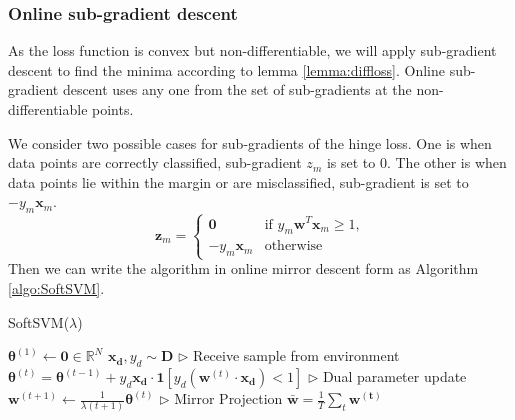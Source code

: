 \documentclass[11pt]{article}
\begin{document}
\subsubsection{Online sub-gradient descent} 


\normalfont
As the loss function is convex but non-differentiable, we will apply sub-gradient descent to find the minima according to lemma \ref{lemma:diffloss}. Online sub-gradient descent uses any one from the set of sub-gradients at the non-differentiable points.

\normalfont
We consider two possible cases for sub-gradients of the hinge loss. One is when data points are correctly classified, sub-gradient $z_m$ is set to 0. The other is when data points lie within the margin or are misclassified, sub-gradient is set to $-y_m\mathbf{x}_m$. 
\[ \mathbf{z}_m =
    \begin{cases}
         \mathbf{0} & 
         \text{if  $y_m\mathbf{w}^T\mathbf{x}_m \geq 1$,}\\
        -y_m\mathbf{x}_m & \text{otherwise}
    \end{cases}
\]
Then we can write the algorithm in online mirror descent form as Algorithm \ref{algo:SoftSVM}. 
\begin{algorithm}[H]
\caption{SoftSVM($\lambda$)}
\label{algo:SoftSVM}
\begin{algorithmic}[1]
\STATE $\boldsymbol{\theta}^{(1)} \leftarrow \mathbf{0} \in \mathbb{R}^N$
\STATE $\boldsymbol{x_d}, y_d \sim \boldsymbol{D}$ \hfill $\triangleright$ Receive sample from environment
\STATE $\boldsymbol{\theta}^{(t)} = \boldsymbol{\theta}^{(t-1)} + y_d\boldsymbol{x_d}\cdot\textbf{1}[y_d(\boldsymbol{w}^{(t)}\cdot \boldsymbol{x_d}) < 1]$ \hfill $\triangleright$ Dual parameter update
\STATE $\boldsymbol{w}^{(t+1)} \leftarrow \frac{1}{\lambda (t+1)}\boldsymbol{\theta}^{(t)}$ \hfill $\triangleright$ Mirror Projection
\ENDFOR
\STATE $\boldsymbol{\bar{w}} = \frac{1}{T}\sum_t \boldsymbol{w^{(t)}}$
\end{algorithmic}
\end{algorithm}
\end{document}
